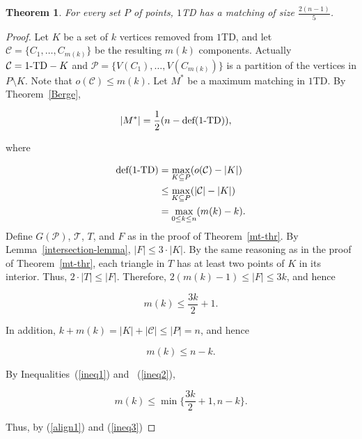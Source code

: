 \documentclass[11pt,a4paper]{article}
\newcommand{\kTD}[2]{$#1$\text{-}TD#2}
\newtheorem{theorem}{Theorem}
\begin{document}
\begin{theorem}
\label{matching-1TD}
 For every set $P$ of points, \kTD{1}{} has a matching of size $\frac{2(n-1)}{5}$.
\end{theorem}

\begin{proof}
Let $K$ be a set of $k$ vertices removed from \kTD{1}{}, and let $\mathcal{C}=\{C_1, \dots, C_{m(k)}\}$ be the resulting $m(k)$ components. Actually $\mathcal{C}=\text{\kTD{1}{}}-K$ and $\mathcal{P}=\{V(C_1),\dots, V(C_{m(k)})\}$ is a partition of the vertices in $P\setminus K$. Note that $o(\mathcal{C})\le m(k)$.
Let $M^*$ be a maximum matching in \kTD{1}{}. By Theorem~\ref{Berge}, 

\begin{align}
\label{align0}
|M^*|&= \frac{1}{2}(n-\text{def}(\text{\kTD{1}{}})),
\end{align}

where

\begin{align}
\label{align1}
\text{def}(\text{\kTD{1}{}})&= \max\limits_{K\subseteq P}(o(\mathcal{C})-|K|)\nonumber\\
& \le \max\limits_{K\subseteq P}(|\mathcal{C}|-|K|)\nonumber\\
& = \max\limits_{0\le k\le n}(m(k)-k).
\end{align}
Define $G(\mathcal{P})$, $\mathcal{T}$, $T$, and $F$ as in the proof of Theorem~\ref{mt-thr}. By Lemma~\ref{intersection-lemma}, $|F|\le 3\cdot|K|$.
By the same reasoning as in the proof of Theorem~\ref{mt-thr}, each triangle in $T$ has at least two points of $K$ in its interior. Thus, $2\cdot|T|\le|F|$. Therefore, $2(m(k)-1)\le |F| \le 3k$, and hence

\begin{equation}
\label{ineq1}
 m(k)\le\frac{3k}{2}+1.
\end{equation} 

In addition, $k+m(k)=|K|+|\mathcal{C}|\le |P|=n$, and hence

\begin{equation}
\label{ineq2}               
m(k)\le n-k.
\end{equation}

By Inequalities~(\ref{ineq1}) and ~(\ref{ineq2}), 

\begin{equation}
\label{ineq3}               
m(k)\le \min\{\frac{3k}{2}+1, n-k\}.
\end{equation}

Thus, by (\ref{align1}) and (\ref{ineq3})


\end{proof}
\end{document}
